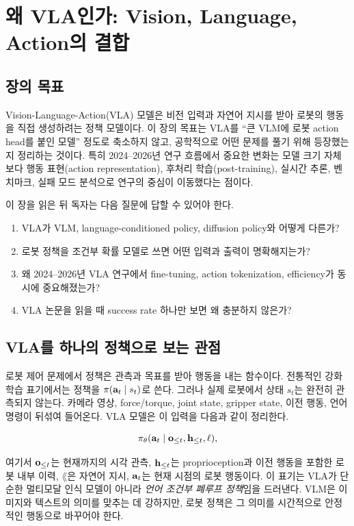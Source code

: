 \chapter{왜 VLA인가: Vision, Language, Action의 결합}

\section{장의 목표}

Vision-Language-Action(VLA) 모델은 비전 입력과 자연어 지시를 받아 로봇의 행동을 직접 생성하려는 정책 모델이다. 이 장의 목표는 VLA를 ``큰 VLM에 로봇 action head를 붙인 모델'' 정도로 축소하지 않고, 공학적으로 어떤 문제를 풀기 위해 등장했는지 정리하는 것이다. 특히 2024--2026년 연구 흐름에서 중요한 변화는 모델 크기 자체보다 행동 표현(action representation), 후처리 학습(post-training), 실시간 추론, 벤치마크, 실패 모드 분석으로 연구의 중심이 이동했다는 점이다.

이 장을 읽은 뒤 독자는 다음 질문에 답할 수 있어야 한다.

\begin{enumerate}
  \item VLA가 VLM, language-conditioned policy, diffusion policy와 어떻게 다른가?
  \item 로봇 정책을 조건부 확률 모델로 쓰면 어떤 입력과 출력이 명확해지는가?
  \item 왜 2024--2026년 VLA 연구에서 fine-tuning, action tokenization, efficiency가 동시에 중요해졌는가?
  \item VLA 논문을 읽을 때 success rate 하나만 보면 왜 충분하지 않은가?
\end{enumerate}

\section{VLA를 하나의 정책으로 보는 관점}

로봇 제어 문제에서 정책은 관측과 목표를 받아 행동을 내는 함수이다. 전통적인 강화학습 표기에서는 정책을 $\pi(\mathbf{a}_t \mid s_t)$로 쓴다. 그러나 실제 로봇에서 상태 $s_t$는 완전히 관측되지 않는다. 카메라 영상, force/torque, joint state, gripper state, 이전 행동, 언어 명령이 뒤섞여 들어온다. VLA 모델은 이 입력을 다음과 같이 정리한다.

\begin{equation}
  \pi_\theta(\mathbf{a}_t \mid \mathbf{o}_{\le t}, \mathbf{h}_{\le t}, \ell),
  \label{eq:vla_policy}
\end{equation}

여기서 $\mathbf{o}_{\le t}$는 현재까지의 시각 관측, $\mathbf{h}_{\le t}$는 proprioception과 이전 행동을 포함한 로봇 내부 이력, $\lang$은 자연어 지시, $\mathbf{a}_t$는 현재 시점의 로봇 행동이다. 이 표기는 VLA가 단순한 멀티모달 인식 모델이 아니라 \emph{언어 조건부 폐루프 정책}임을 드러낸다. VLM은 이미지와 텍스트의 의미를 맞추는 데 강하지만, 로봇 정책은 그 의미를 시간적으로 안정적인 행동으로 바꾸어야 한다.

